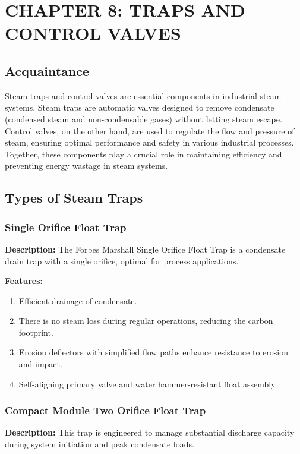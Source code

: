 \section{CHAPTER 8: TRAPS AND CONTROL VALVES}
\subsection{Acquaintance}
Steam traps and control valves are essential components in industrial steam systems. Steam traps are automatic valves designed to remove condensate (condensed steam and non-condensable gases) without letting steam escape. Control valves, on the other hand, are used to regulate the flow and pressure of steam, ensuring optimal performance and safety in various industrial processes. Together, these components play a crucial role in maintaining efficiency and preventing energy wastage in steam systems.

\subsection{Types of Steam Traps}
\subsubsection{Single Orifice Float Trap}

\textbf{Description:} The Forbes Marshall Single Orifice Float Trap is a condensate drain trap with a single orifice, optimal for process applications.

\textbf{Features:}
\begin{enumerate}
    \item Efficient drainage of condensate.
    \item There is no steam loss during regular operations, reducing the carbon footprint.
    \item Erosion deflectors with simplified flow paths enhance resistance to erosion and impact.
    \item Self-aligning primary valve and water hammer-resistant float assembly.
\end{enumerate}
\subsubsection{Compact Module Two Orifice Float Trap}

\textbf{Description:} This trap is engineered to manage substantial discharge capacity during system initiation and peak condensate loads.

